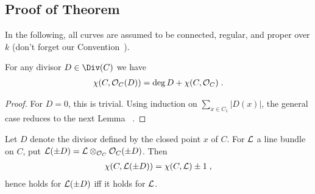 \documentclass[a4paper,parskip=half,numbers=enddot, DIV=12]{scrreprt}
\begin{document}
\subsection[Proof of Theorem\texorpdfstring{~\getrefnumber{thm:CurvesSerreDuality}\itememph{a}}{ 7(a)}]{Proof of Theorem\texorpdfstring{~}{ 7(a)}}
In the following, all curves are assumed to be connected, regular, and proper over $k$ (don't forget our Convention~).
\begin{lem}
	For any divisor $D\in\Div(C)$ we have
	\begin{align}\lbl{eq:RiemannRoch4}
	\chi(C,\Oo_C(D))=\deg D+\chi(C,\Oo_C)\;.
	\end{align}
\end{lem}
\begin{proof}
	For $D=0$, this is trivial. Using induction on $\sum_{x\in C_1}|D(x)|$, the general case reduces to the next Lemma~ .
\end{proof}
\begin{lem}
	Let $D$ denote the divisor defined by the closed point $x$ of $C$. For $\mathcal{L}$ a line bundle on $C$, put $\mathcal{L}(\pm D)=\mathcal{L}\otimes_{\mathcal{O}_C}\mathcal{O}_C(\pm D)$. Then
	\begin{align*}
	\chi(C,\mathcal{L}(\pm D))=\chi(C,\mathcal{L})\pm 1\;,
	\end{align*}
	hence  holds for $\mathcal{L}(\pm D)$ iff it holds for $\mathcal{L}$.
\end{lem}
\end{document}
